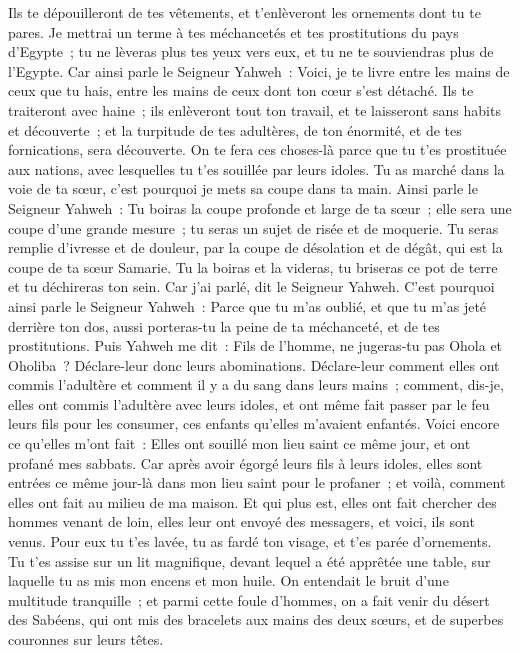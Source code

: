 \begin{multicols}{2}
Ils te dépouilleront de tes vêtements, et t'enlèveront les ornements dont tu te pares.
Je mettrai un terme à tes méchancetés et tes prostitutions du pays d'Egypte~; tu ne lèveras plus tes yeux vers eux, et tu ne te souviendras plus de l'Egypte.
Car ainsi parle le Seigneur Yahweh~: Voici, je te livre entre les mains de ceux que tu hais, entre les mains de ceux dont ton cœur s'est détaché.
Ils te traiteront avec haine~; ils enlèveront tout ton travail, et te laisseront sans habits et découverte~; et la turpitude de tes adultères, de ton énormité, et de tes fornications, sera découverte.
On te fera ces choses-là parce que tu t'es prostituée aux nations, avec lesquelles tu t'es souillée par leurs idoles.
Tu as marché dans la voie de ta sœur, c'est pourquoi je mets sa coupe dans ta main.
Ainsi parle le Seigneur Yahweh~: Tu boiras la coupe profonde et large de ta sœur~; elle sera une coupe d'une grande mesure~; tu seras un sujet de risée et de moquerie.
Tu seras remplie d'ivresse et de douleur, par la coupe de désolation et de dégât, qui est la coupe de ta sœur Samarie.
Tu la boiras et la videras, tu briseras ce pot de terre et tu déchireras ton sein. Car j'ai parlé, dit le Seigneur Yahweh.
C'est pourquoi ainsi parle le Seigneur Yahweh~: Parce que tu m'as oublié, et que tu m'as jeté derrière ton dos, aussi porteras-tu la peine de ta méchanceté, et de tes prostitutions.
Puis Yahweh me dit~: Fils de l'homme, ne jugeras-tu pas Ohola et Oholiba~? Déclare-leur donc leurs abominations.
Déclare-leur comment elles ont commis l'adultère et comment il y a du sang dans leurs mains~; comment, dis-je, elles ont commis l'adultère avec leurs idoles, et ont même fait passer par le feu leurs fils pour les consumer, ces enfants qu'elles m'avaient enfantés.
Voici encore ce qu'elles m'ont fait~: Elles ont souillé mon lieu saint ce même jour, et ont profané mes sabbats.
Car après avoir égorgé leurs fils à leurs idoles, elles sont entrées ce même jour-là dans mon lieu saint pour le profaner~; et voilà, comment elles ont fait au milieu de ma maison.
Et qui plus est, elles ont fait chercher des hommes venant de loin, elles leur ont envoyé des messagers, et voici, ils sont venus. Pour eux tu t'es lavée, tu as fardé ton visage, et t'es parée d'ornements.
Tu t'es assise sur un lit magnifique, devant lequel a été apprêtée une table, sur laquelle tu as mis mon encens et mon huile.
On entendait le bruit d'une multitude tranquille~; et parmi cette foule d'hommes, on a fait venir du désert des Sabéens, qui ont mis des bracelets aux mains des deux sœurs, et de superbes couronnes sur leurs têtes.

\end{multicols}
